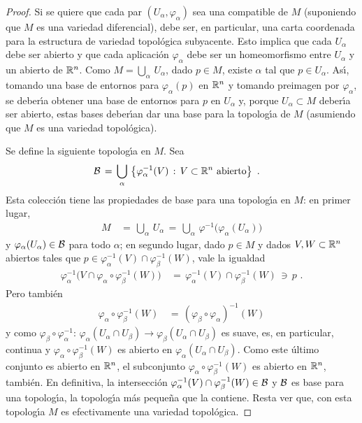 \begin{proof}
	Si se quiere que cada par $(U_{\alpha},\varphi_{\alpha})$ sea una
	compatible de $M$ (suponiendo que $M$ es una variedad diferencial),
	debe ser, en particular, una carta coordenada para la estructura de
	variedad topol\'{o}gica subyacente. Esto implica que cada
	$U_{\alpha}$ debe ser abierto y que cada aplicaci\'{o}n
	$\varphi_{\alpha}$ debe ser un homeomorfismo entre $U_{\alpha}$ y un
	abierto de $\bb{R}^{n}$. Como $M=\bigcup_{\alpha}\,U_{\alpha}$,
	dado $p\in M$, existe $\alpha$ tal que $p\in U_{\alpha}$. As\'{\i},
	tomando una base de entornos para $\varphi_{\alpha}(p)$ en
	$\bb{R}^{n}$ y tomando preimagen por $\varphi_{\alpha}$, se
	deber\'{\i}a obtener una base de entornos para $p$ en $U_{\alpha}$
	y, porque $U_{\alpha}\subset M$ deber\'{\i}a ser abierto, estas bases
	deber\'{\i}an dar una base para la topolog\'{\i}a de $M$
	(asumiendo que $M$ es una variedad topol\'{o}gica).

	Se define la siguiente topolog\'{\i}a en $M$. Sea
	\begin{align*}
		\cal{B} & \,=\,\bigcup_{\alpha}\,
			\left\lbrace\varphi_{\alpha}^{-1}(V)\,:\,
				V\subset\bb{R}^{n}\text{ abierto}\right\rbrace
		\text{ .}
	\end{align*}
	Esta colecci\'{o}n tiene las propiedades de base para una
	topolog\'{\i}a en $M$: en primer lugar,
	\begin{align*}
		M & \,=\,\bigcup_{\alpha}\,U_{\alpha} \,=\,
			\bigcup_{\alpha}\,
			\varphi^{-1}\big(\varphi_{\alpha}(U_{\alpha})\big)
	\end{align*}
	y $\varphi_{\alpha}(U_{\alpha})\in\cal{B}$ para todo $\alpha$; en
	segundo lugar, dado $p\in M$ y dados $V,W\subset\bb{R}^{n}$
	abiertos tales que
	$p\in\varphi_{\alpha}^{-1}(V)\cap\varphi_{\beta}^{-1}(W)$, vale
	la igualdad
	\begin{align*}
		\varphi_{\alpha}^{-1}\big(
			V\cap\varphi_{\alpha}\circ\varphi_{\beta}^{-1}(W)
			\big) & \,=\,
			\varphi_{\alpha}^{-1}(V)\cap\varphi_{\beta}^{-1}(W)
			\,\ni\,p
		\text{ .}
	\end{align*}
	Pero tambi\'{e}n
	\begin{align*}
		\varphi_{\alpha}\circ\varphi_{\beta}^{-1}(W) & \,=\,
		(\varphi_{\beta}\circ\varphi_{\alpha})^{-1}(W)
	\end{align*}
	y como $\varphi_{\beta}\circ\varphi_{\alpha}^{-1}:\,%
		\varphi_{\alpha}(U_{\alpha}\cap U_{\beta})\rightarrow%
		\varphi_{\beta}(U_{\alpha}\cap U_{\beta})$ es suave, es,
	en particular, continua y
	$\varphi_{\alpha}\circ\varphi_{\beta}^{-1}(W)$ es abierto en
	$\varphi_{\alpha}(U_{\alpha}\cap U_{\beta})$. Como este \'{u}ltimo
	conjunto es abierto en $\bb{R}^{n}$, el subconjunto
	$\varphi_{\alpha}\circ\varphi_{\beta}^{-1}(W)$ es abierto en
	$\bb{R}^{n}$, tambi\'{e}n. En definitiva, la intersecci\'{o}n
	$\varphi_{\alpha}^{-1}(V)\cap\varphi_{\beta}^{-1}(W)\in\cal{B}$
	y $\cal{B}$ es base para una topolog\'{\i}a, la topolog\'{\i}a m\'{a}s
	peque\~{n}a que la contiene. Resta ver que, con esta topolog\'{\i}a
	$M$ es efectivamente una variedad topol\'{o}gica.
	

\end{proof}
